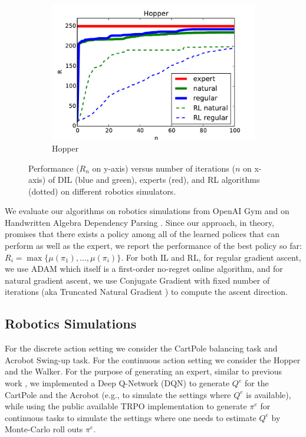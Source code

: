 \documentclass{article}
\begin{document}
\begin{figure}[t!]
\begin{subfigure}[l]{0.1962\textwidth}
        \includegraphics[width=1.12\textwidth,keepaspectratio]{./figure/Hopper_comparison.pdf}
        \caption{Hopper}
        \label{fig:hopper}
    \end{subfigure}
    \caption{Performance ($R_n$ on y-axis) versus number of iterations ($n$ on x-axis) of DIL (blue and green), experts (red), and RL algorithms (dotted) on different robotics simulators. }
    \label{fig:perf_robotics}
\end{figure}
We evaluate our algorithms on robotics simulations from OpenAI Gym \cite{brockman2016openai} and on Handwritten Algebra Dependency Parsing \cite{duyckpredicting}. Since our approach, in theory, promises that there exists a policy among all of the learned polices that can perform as well as the expert, we report the performance of the best policy so far: $R_i = \max\{\mu(\pi_1), ..., \mu(\pi_i)\}$. For both IL and RL, for regular gradient ascent, we use ADAM \cite{kingma2014adam} which itself is a first-order no-regret online algorithm, and for natural gradient ascent, we use Conjugate Gradient with fixed number of iterations (aka Truncated Natural Gradient \cite{duan2016benchmarking}) to compute the ascent direction. 


\subsection{Robotics Simulations}
For the discrete action setting we consider the CartPole balancing task and Acrobot Swing-up task. For the continuous action setting we consider the Hopper and the Walker. For the purpose of generating an expert, similar to previous work \cite{ho2016generative}, we implemented a Deep Q-Network (DQN) to generate $Q^e$ for the CartPole and the Acrobot (e.g., to simulate the settings where $Q^e$ is available), while using the public available TRPO implementation to generate $\pi^e$ for continuous tasks to simulate the settings where one needs to estimate $Q^e$ by Monte-Carlo roll outs $\pi^e$. %
\end{document}
